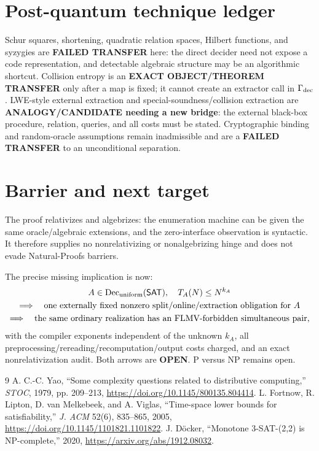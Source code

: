\documentclass[11pt]{article}
\newcommand{\SAT}{\mathsf{SAT}}
\begin{document}
\section{Post-quantum technique ledger}
Schur squares, shortening, quadratic relation spaces, Hilbert functions, and
syzygies are \textbf{FAILED TRANSFER} here: the direct decider need not expose
a code representation, and detectable algebraic structure may be an
algorithmic shortcut.  Collision entropy is an \textbf{EXACT
OBJECT/THEOREM TRANSFER} only after a map is fixed; it cannot create an
extractor call in \(\Gamma_{\rm dec}\).  LWE-style external extraction and
special-soundness/collision extraction are \textbf{ANALOGY/CANDIDATE needing
a new bridge}: the external black-box procedure, relation, queries, and all
costs must be stated.  Cryptographic binding and random-oracle assumptions
remain inadmissible and are a \textbf{FAILED TRANSFER} to an unconditional
separation.

\section{Barrier and next target}
The proof relativizes and algebrizes: the enumeration machine can be given the
same oracle/algebraic extensions, and the zero-interface observation is
syntactic.  It therefore supplies no nonrelativizing or nonalgebrizing hinge
and does not evade Natural-Proofs barriers.

The precise missing implication is now:
\[
\begin{gathered}
 A\in\operatorname{Dec}_{\rm uniform}(\SAT),\quad T_A(N)\le N^{k_A}
 \\
 \Longrightarrow\quad
 \text{one externally fixed nonzero split/online/extraction obligation for }A
 \\
 \Longrightarrow\quad
 \text{the same ordinary realization has an FLMV-forbidden simultaneous pair,}
\end{gathered}
\]
with the compiler exponents independent of the unknown \(k_A\), all
preprocessing/rereading/recomputation/output costs charged, and an exact
nonrelativization audit.  Both arrows are \textbf{OPEN}.  P versus NP remains
open.

\begin{thebibliography}{9}
A. C.-C. Yao, ``Some complexity questions related to distributive
computing,'' \emph{STOC}, 1979, pp. 209--213,
\url{https://doi.org/10.1145/800135.804414}.
L. Fortnow, R. Lipton, D. van Melkebeek, and A. Viglas,
``Time-space lower bounds for satisfiability,'' \emph{J. ACM} 52(6),
835--865, 2005, \url{https://doi.org/10.1145/1101821.1101822}.
J. D\"ocker, ``Monotone 3-SAT-(2,2) is NP-complete,'' 2020,
\url{https://arxiv.org/abs/1912.08032}.
\end{thebibliography}

\end{document}
